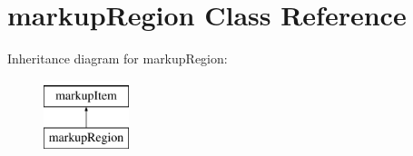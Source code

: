 \hypertarget{classmarkupRegion}{
\section{markupRegion Class Reference}
\label{classmarkupRegion}
}
Inheritance diagram for markupRegion:\begin{figure}[H]
\begin{center}
\leavevmode
\includegraphics[height=2.000000cm]{classmarkupRegion}
\end{center}
\end{figure}
